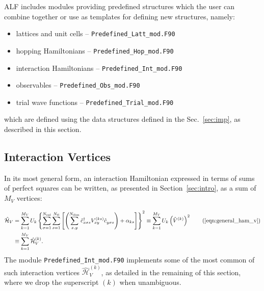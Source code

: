 





ALF includes modules providing predefined structures which the user can combine together or use as templates for defining new structures, namely: 
\begin{itemize}
	\item lattices and unit cells -- \texttt{Predefined\_Latt\_mod.F90}
	\item hopping Hamiltonians -- \texttt{Predefined\_Hop\_mod.F90 }
	\item interaction Hamiltonians -- \texttt{Predefined\_Int\_mod.F90}
	\item observables -- \texttt{Predefined\_Obs\_mod.F90 }
	\item trial wave functions -- \texttt{Predefined\_Trial\_mod.F90 }
\end{itemize}
which are defined using the data structures defined in the Sec.~\ref{sec:imp}, as described in this section.






\subsection{Interaction Vertices}

In its most general form, an interaction Hamiltonian expressed in terms of sums of perfect squares can be written, as presented in Section~\ref{sec:intro}, as a sum of $M_V$ vertices: %

\begin{align*}
\hat{\mathcal{H}}_{V} &=  \sum\limits_{k=1}^{M_V}U_{k}
\left\{ \sum\limits_{\sigma=1}^{N_{\mathrm{col}}}
\sum\limits_{s=1}^{N_{\mathrm{fl}}} \left[ \left(
\sum\limits_{x,y}^{N_{\mathrm{dim}}} \hat{c}^{\dagger}_{x \sigma s}V_{xy}^{(k s)}\hat{c}^{\phantom\dagger}_{y \sigma s}\right)  +\alpha_{k s}  \right] \right\}^{2}
\equiv    \sum\limits_{k=1}^{M_V}U_{k}   \left(\hat{V}^{(k)} \right)^2 \tag{\ref{eqn:general_ham_v}}\\
&\equiv    \sum\limits_{k=1}^{M_V}\hat{\mathcal{H}}_V^{(k)}.
\end{align*}
The module \texttt{Predefined\_Int\_mod.F90} implements some of the most common of such interaction vertices $\hat{\mathcal{H}}_V^{(k)}$, as detailed in the remaining of this section, where we drop the superscript $(k)$ when unambiguous.

